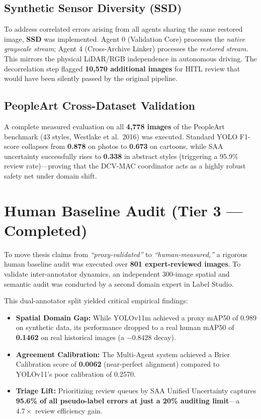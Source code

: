 \documentclass[11pt,a4paper]{article}
\theoremstyle{plain}
\begin{document}
\subsection{Synthetic Sensor Diversity (SSD)}

To address correlated errors arising from all agents sharing the same restored image, \textbf{SSD} was implemented. Agent 0 (Validation Core) processes the \textit{native grayscale stream}; Agent 4 (Cross-Archive Linker) processes the \textit{restored stream}. This mirrors the physical LiDAR/RGB independence in autonomous driving. The decorrelation step flagged \textbf{10{,}570 additional images} for HITL review that would have been silently passed by the original pipeline.

\subsection{PeopleArt Cross-Dataset Validation}

A complete measured evaluation on all \textbf{4,778 images} of the PeopleArt benchmark (43 styles, Westlake et al.\ 2016) was executed. Standard YOLO F1-score collapses from \textbf{0.878} on photos to \textbf{0.673} on cartoons, while SAA uncertainty successfully rises to \textbf{0.338} in abstract styles (triggering a 95.9\% review rate)—proving that the DCV-MAC coordinator acts as a highly robust safety net under domain shift.

\section{Human Baseline Audit (Tier 3 — Completed)}

To move thesis claims from \textit{``proxy-validated''} to \textit{``human-measured,''} a rigorous human baseline audit was executed over \textbf{801 expert-reviewed images}. To validate inter-annotator dynamics, an independent 300-image spatial and semantic audit was conducted by a second domain expert in Label Studio.

This dual-annotator split yielded critical empirical findings:
\begin{itemize}[leftmargin=2em, noitemsep]
  \item \textbf{Spatial Domain Gap:} While YOLOv11m achieved a proxy mAP50 of 0.989 on synthetic data, its performance dropped to a real human mAP50 of \textbf{0.1462} on real historical images (a $-0.8428$ decay).
  \item \textbf{Agreement Calibration:} The Multi-Agent system achieved a Brier Calibration score of \textbf{0.0062} (near-perfect alignment) compared to YOLOv11's poor calibration of 0.2570.
  \item \textbf{Triage Lift:} Prioritizing review queues by SAA Unified Uncertainty captures \textbf{95.6\% of all pseudo-label errors at just a 20\% auditing limit}—a $4.7\times$ review efficiency gain.
\end{itemize}
\end{document}
